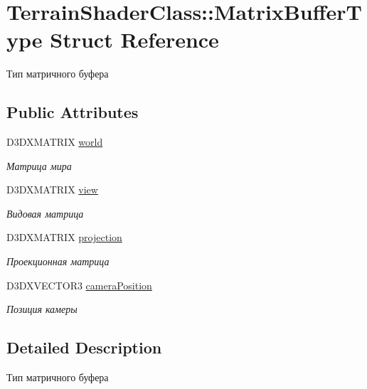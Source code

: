 \hypertarget{struct_terrain_shader_class_1_1_matrix_buffer_type}{}\section{Terrain\+Shader\+Class\+:\+:Matrix\+Buffer\+Type Struct Reference}
\label{struct_terrain_shader_class_1_1_matrix_buffer_type}


Тип матричного буфера  


\subsection*{Public Attributes}
\begin{DoxyCompactItemize}
\item 
D3\+D\+X\+M\+A\+T\+R\+IX \hyperlink{struct_terrain_shader_class_1_1_matrix_buffer_type_a64a50843d3023e4ad05231c9e482ed63}{world}
\begin{DoxyCompactList}\small\item\em Матрица мира \end{DoxyCompactList}\item 
D3\+D\+X\+M\+A\+T\+R\+IX \hyperlink{struct_terrain_shader_class_1_1_matrix_buffer_type_a3d6d982202727ab091d68ddbb6fce7eb}{view}
\begin{DoxyCompactList}\small\item\em Видовая матрица \end{DoxyCompactList}\item 
D3\+D\+X\+M\+A\+T\+R\+IX \hyperlink{struct_terrain_shader_class_1_1_matrix_buffer_type_a998a1845ef397ff83d8d9d9a6fe449be}{projection}
\begin{DoxyCompactList}\small\item\em Проекционная матрица \end{DoxyCompactList}\item 
D3\+D\+X\+V\+E\+C\+T\+O\+R3 \hyperlink{struct_terrain_shader_class_1_1_matrix_buffer_type_ae3214797bed0a82e9ad5682c038c8613}{camera\+Position}
\begin{DoxyCompactList}\small\item\em Позиция камеры \end{DoxyCompactList}\end{DoxyCompactItemize}


\subsection{Detailed Description}
Тип матричного буфера 

